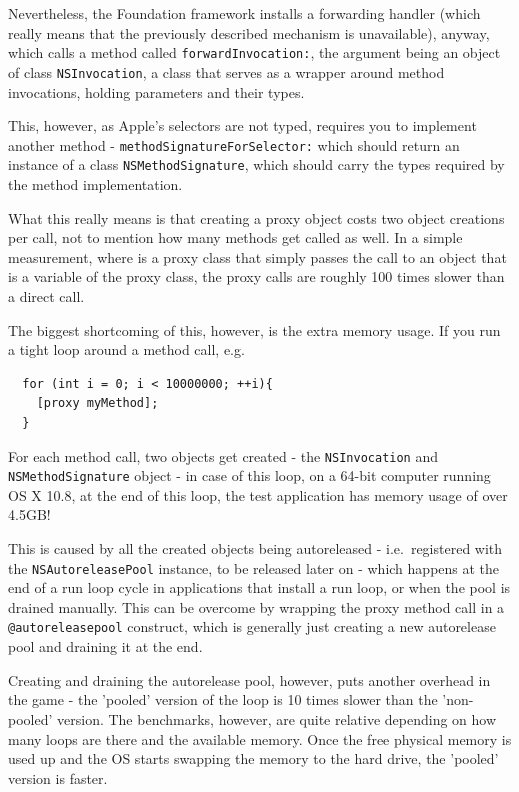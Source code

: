 Nevertheless, the Foundation framework installs a forwarding handler (which really means that the previously described mechanism is unavailable), anyway, which calls a method called \verb=forwardInvocation:=, the argument being an object of class \verb=NSInvocation=, a class that serves as a wrapper around method invocations, holding parameters and their types.

This, however, as Apple's selectors are not typed, requires you to implement another method - \verb=methodSignatureForSelector:= which should return an instance of a class \verb=NSMethodSignature=, which should carry the types required by the method implementation.

What this really means is that creating a proxy object costs two object creations per call, not to mention how many methods get called as well. In a simple measurement, where is a proxy class that simply passes the call to an object that is a variable of the proxy class, the proxy calls are roughly 100 times slower than a direct call.

The biggest shortcoming of this, however, is the extra memory usage. If you run a tight loop around a method call, e.g.

\begin{verbatim}
  for (int i = 0; i < 10000000; ++i){
    [proxy myMethod];
  }
\end{verbatim}

For each method call, two objects get created - the \verb=NSInvocation= \newline{}and \verb=NSMethodSignature= object - in case of this loop, on a 64-bit computer running OS X 10.8, at the end of this loop, the test application has memory usage of over 4.5GB!

This is caused by all the created objects being autoreleased - i.e.\ registered with the \verb=NSAutoreleasePool= instance, to be released later on - which happens at the end of a run loop cycle in applications that install a run loop, or when the pool is drained manually. This can be overcome by wrapping the proxy method call in a \verb=@autoreleasepool= construct, which is generally just creating a new autorelease pool and draining it at the end.

Creating and draining the autorelease pool, however, puts another overhead in the game - the 'pooled' version of the loop is 10 times slower than the 'non-pooled' version. The benchmarks, however, are quite relative depending on how many loops are there and the available memory. Once the free physical memory is used up and the OS starts swapping the memory to the hard drive, the 'pooled' version is faster.

